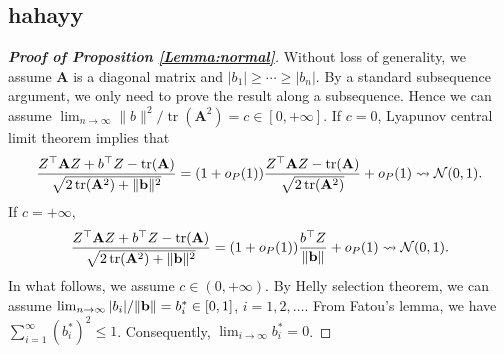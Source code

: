 \documentclass[11pt]{article}
\DeclareMathOperator{\mytr}{tr}
\newcommand{\BA}{\mathbf{A}}    \newcommand{\BB}{\mathbf{B}}    \newcommand{\BC}{\mathbf{C}}    \newcommand{\BD}{\mathbf{D}}    \newcommand{\BE}{\mathbf{E}}    \newcommand{\BF}{\mathbf{F}}    \newcommand{\BG}{\mathbf{G}}    \newcommand{\BH}{\mathbf{H}}    \newcommand{\BI}{\mathbf{I}}    \newcommand{\BJ}{\mathbf{J}}    \newcommand{\BK}{\mathbf{K}}    \newcommand{\BL}{\mathbf{L}}
\theoremstyle{plain}
\theoremstyle{definition}
\theoremstyle{remark}
\begin{document}
\begin{appendices}
\section{hahayy}

\begin{proof}[\textbf{Proof of Proposition \ref{Lemma:normal}}]

    Without loss of generality, we assume $\BA$ is a diagonal matrix and $|b_1|\geq \cdots\geq |b_n|$.
    By a standard subsequence argument, we only need to prove the result along a subsequence.
    Hence we can assume $\lim_{n\to \infty}\|b\|^2/\mytr(\BA^2) =c \in [0,+\infty]$.
    If $ c=0$, Lyapunov central limit theorem implies that
    \begin{equation*}
        \frac{Z^\top \BA Z + b^\top Z - \mytr(\BA)}{\sqrt{2\mytr(\BA^2)+\|\Bb\|^2}}
        =(1+o_P(1))
        \frac{Z^\top \BA Z - \mytr(\BA)}{\sqrt{2\mytr(\BA^2)}}
        +o_P(1)
        \rightsquigarrow \mathcal N (0,1).
    \end{equation*}
    If $c=+\infty$,
    \begin{equation*}
        \frac{Z^\top \BA Z + b^\top Z - \mytr(\BA)}{\sqrt{2\mytr(\BA^2)+\|\Bb\|^2}}
        =(1+o_P(1))
        \frac{b^\top Z}{\|\Bb\|}
        +o_P(1)
        \rightsquigarrow \mathcal N (0,1).
    \end{equation*}
    In what follows, we assume $c\in (0,+\infty)$.
    By Helly selection theorem, we can assume $\lim_{n\to \infty} |b_i|/\|\mathbf{b}\|= b_i^*\in [0,1]$, $i=1,2,\ldots$.
From Fatou's lemma, we have $\sum_{i=1}^{\infty} (b_i^{*})^2\leq 1$.
Consequently, $\lim_{i\to \infty} b_i^* =0$.


\end{proof}
\end{appendices}
\end{document}
